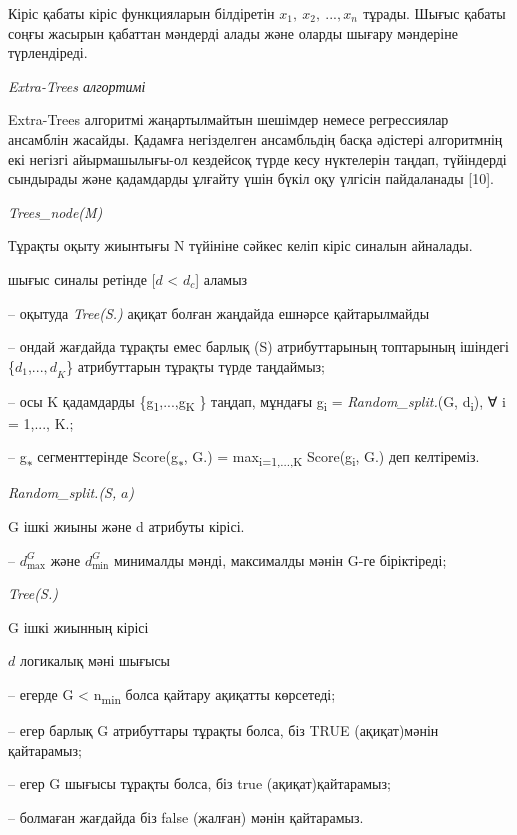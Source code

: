 \begin{multicols}{2}
Кіріс қабаты кіріс функцияларын білдіретін
\(x_{1},\ x_{2},\ ...,x_{n\ }\ \)тұрады. Шығыс қабаты соңғы жасырын
қабаттан мәндерді алады және оларды шығару мәндеріне түрлендіреді.

\emph{Extra-Trees алгортимі}

Extra-Trees алгоритмі жаңартылмайтын шешімдер немесе регрессиялар
ансамблін жасайды. Қадамға негізделген ансамбльдің басқа әдістері
алгоритмнің екі негізгі айырмашылығы-ол кездейсоқ түрде кесу нүктелерін
таңдап, түйіндерді сындырады және қадамдарды ұлғайту үшін бүкіл оқу
үлгісін пайдаланады {[}10{]}.

\emph{Trees\_node(M)}

Тұрақты оқыту жиынтығы N түйініне сәйкес келіп кіріс синалын айналады.

шығыс синалы ретінде {[}\(d\) \textless{} \(d_{c}\){]} аламыз

-- оқытуда \emph{Tree(S.)} ақиқат болған жаңдайда ешнәрсе қайтарылмайды

-- ондай жағдайда тұрақты емес барлық (S) атрибуттарының топтарының
ішіндегі \{\(d_{1}\),...\({,d}_{K}\)\} атрибуттарын тұрақты түрде
таңдаймыз;

-- осы K қадамдарды \{g\textsubscript{1},...,g\textsubscript{K} \}
таңдап, мұндағы g\textsubscript{i} = \emph{Random\_split.}(G,
d\textsubscript{i}), ∀ i = 1,..., K.;

-- g\textsubscript{∗} сегменттерінде Score(g\textsubscript{∗}, G.) =
max\textsubscript{i=1,...,K} Score(g\textsubscript{i}, G.) деп
келтіреміз.

\emph{Random\_split.(S,} \(a\)\emph{)}

G ішкі жиыны және d атрибуты кірісі.

-- \(d_{\max}^{G}\) және \(d_{\min}^{G}\) минималды мәнді, максималды
мәнін G-ге біріктіреді;

\emph{Tree(S.)}

G ішкі жиынның кірісі

\(d\) логикалық мәні шығысы

-- егерде \textbar{} G \textbar{} \textless{} n\textsubscript{min} болса
қайтару ақиқатты көрсетеді;

-- егер барлық G атрибуттары тұрақты болса, біз TRUE (ақиқат)мәнін
қайтарамыз;

-- егер G шығысы тұрақты болса, біз true (ақиқат)қайтарамыз;

-- болмаған жағдайда біз false (жалған) мәнін қайтарамыз.


\end{multicols}
